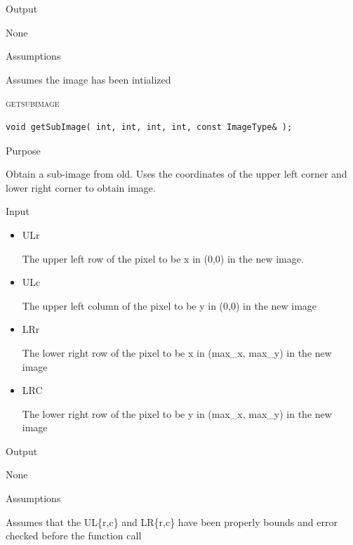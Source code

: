 \documentclass[pdftex, 11pt]{article}
\begin{document}
\begin{description}
\begin{description}
			\item{Output}

				None

			\item{Assumptions}

				Assumes the image has been intialized

		\end{description}


	\item{\textsc{getsubimage}}
		\begin{description}

\begin{lstlisting}
void getSubImage( int, int, int, int, const ImageType& );
\end{lstlisting}

			\item{Purpose}

 				Obtain a sub-image from old.  Uses the coordinates
				of the upper left corner
				and lower right corner to obtain image.

			\item{Input}

				\begin{itemize}

					\item{ULr}
	
						The upper left row of the pixel
						to be x in (0,0) in the new image.

					\item{ULc}

						The upper left column of the pixel
						to be y in (0,0) in the new image

					\item{LRr}

						The lower right row of the pixel
						to be x in (max\_x, max\_y) in the
						new image

					\item{LRC}

						The lower right row of the pixel
						to be y in (max\_x, max\_y) in the
						new image

				\end{itemize}


			\item{Output}

				None


			\item{Assumptions}

				Assumes that the UL\{r,c\} and LR\{r,c\} have been
				properly bounds and error checked before the function
				call


\end{description}
\end{description}
\end{document}
